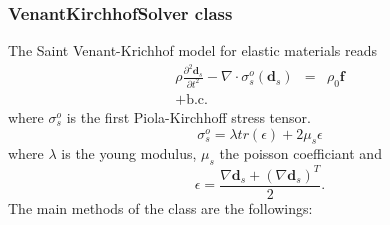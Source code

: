 \documentclass[11pt]{article}
\begin{document}

\subsubsection{VenantKirchhofSolver class}
\label{sec:venantKirchhofSolver}
The Saint Venant-Krichhof model for elastic materials reads
\begin{eqnarray}
\rho\frac{\partial^2\boldsymbol{d}_s}{\partial t^2} - \nabla\cdot\sigma_s^o(\boldsymbol{d}_s) & = & \rho_0\mathbf{f} \label{eqn:VenantKirchhof}\\
+\text{b.c.}\nonumber
\end{eqnarray}
where $\sigma_s^o$ is the first Piola-Kirchhoff stress tensor.
\begin{equation}
\sigma_s^o=\lambda tr(\epsilon)+2\mu_s\epsilon
\end{equation}
where $\lambda$ is the young modulus, $\mu_s$ the poisson coefficiant and
\begin{equation}
\epsilon=\frac{\nabla\boldsymbol{d}_s+(\nabla\boldsymbol{d}_s)^T}{2}.
\end{equation}
The main methods of the class are the followings:
\end{document}
